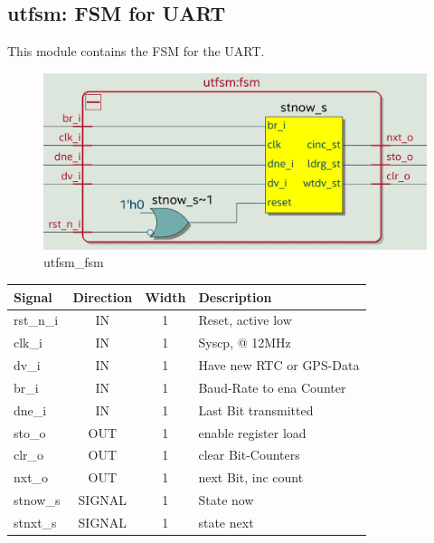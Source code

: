 \documentclass[12pt,a4 paper] {report}
\begin{document}
\subsection{utfsm: FSM for UART}
This module contains the FSM for the UART.
\begin{figure}[h]
	\centering	
	\includegraphics[scale=0.2]{../png/utfsm_fsm.png}
	\caption{utfsm\_fsm}
\end{figure}
\begin{center}
	\begin{tabular}{ | p{2cm} | c | c | p{5cm} |}
		\hline
		\textbf{Signal} & \textbf{Direction} & \textbf{Width} & \textbf{Description} \\
		\hline	
		rst\_n\_i & IN & 1 & Reset, active low \\
		\hline
		clk\_i & IN & 1 & Syscp, @ 12MHz \\
		\hline
		dv\_i  & IN & 1 & Have new RTC or GPS-Data \\
		\hline
		br\_i  & IN & 1 & Baud-Rate to ena Counter \\
		\hline
		dne\_i & IN & 1 & Last Bit transmitted \\
		\hline
		sto\_o & OUT & 1 & enable register load \\
		\hline
		clr\_o & OUT & 1 & clear Bit-Counters \\
		\hline
		nxt\_o & OUT & 1 & next Bit, inc count \\
		\hline
		\hline
		stnow\_s & SIGNAL & 1 & State now \\
		\hline
		stnxt\_s & SIGNAL & 1 & state next \\
		\hline
	\end{tabular}
\end{center}

\newpage
\end{document}
